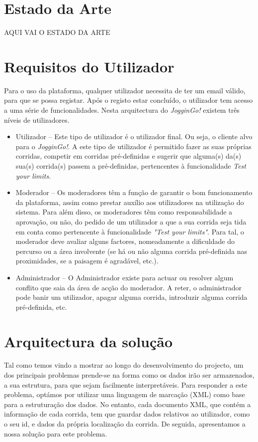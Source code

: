 \documentclass[twocolumn,twoside,10pt,a4paper]{article}
\begin{document}
\section{Estado da Arte}\label{sec:estarte}
AQUI VAI O ESTADO DA ARTE

\section{Requisitos do Utilizador}\label{sec:application}

Para o uso da plataforma, qualquer utilizador necessita de ter um email válido, para que se possa registar. Após o registo estar concluído, o utilizador tem acesso a uma série de funcionalidades. Nesta arquitectura do \textit{JogginGo!} existem três níveis de utilizadores.

\begin{itemize}
\item {Utilizador} -- Este tipo de utilizador é o utilizador final. Ou seja, o cliente alvo para o \textit{JogginGo!}. A este tipo de utilizador é permitido fazer as suas próprias corridas, competir em corridas pré-definidas e sugerir que alguma(s) da(s) sua(s) corrida(s) passem a pré-definidas, pertencentes à funcionalidade \textit{Test your limits}.
\item{Moderador} -- Os moderadores têm a função de garantir o bom funcionamento da plataforma, assim como prestar auxílio aos utilizadores na utilização do sistema. Para além disso, os moderadores têm como responsabilidade a aprovação, ou não, do pedido de um utilizador a que a sua corrida seja tida em conta como pertencente à funcionalidade \textit{"Test your limits"}. Para tal, o moderador deve avaliar alguns factores, nomeadamente a dificuldade do percurso ou a área involvente (se há ou não alguma corrida pré-definida nas proximidades, se a paisagem é agradável, etc.).
\item{Administrador} -- O Administrador existe para actuar ou resolver algum conflito que saia da área de acção do moderador. A reter, o administrador pode banir um utilizador, apagar alguma corrida, introduzir alguma corrida pré-definida, etc.
\end{itemize}

\section{Arquitectura da solução}
Tal como temos vindo a mostrar ao longo do desenvolvimento do projecto, um dos principais problemas prende-se na forma como os dados irão ser armazenados, a sua estrutura, para que sejam facilmente interpretáveis. Para responder a este problema, optámos por utilizar uma linguagem de marcação (XML) como base para a estruturação dos dados. No entanto, cada documento XML, que contém a informação de cada corrida, tem que guardar dados relativos ao utilizador, como o seu id, e dados da própria localização da corrida. De seguida, apresentamos a nossa solução para este problema.
\end{document}
